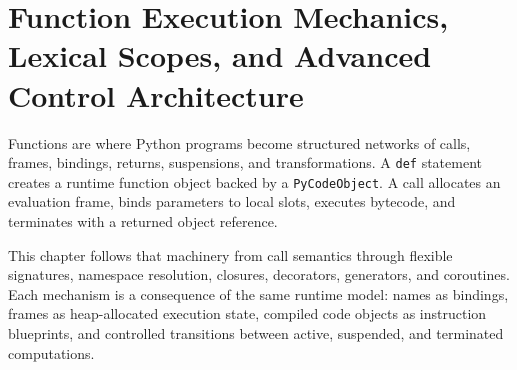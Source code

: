 \chapter{Function Execution Mechanics, Lexical Scopes, and Advanced Control Architecture}

Functions are where Python programs become structured networks of calls, frames, bindings, returns, suspensions, and transformations. A \texttt{def} statement creates a runtime function object backed by a \texttt{PyCodeObject}. A call allocates an evaluation frame, binds parameters to local slots, executes bytecode, and terminates with a returned object reference.

This chapter follows that machinery from call semantics through flexible signatures, namespace resolution, closures, decorators, generators, and coroutines. Each mechanism is a consequence of the same runtime model: names as bindings, frames as heap-allocated execution state, compiled code objects as instruction blueprints, and controlled transitions between active, suspended, and terminated computations.
